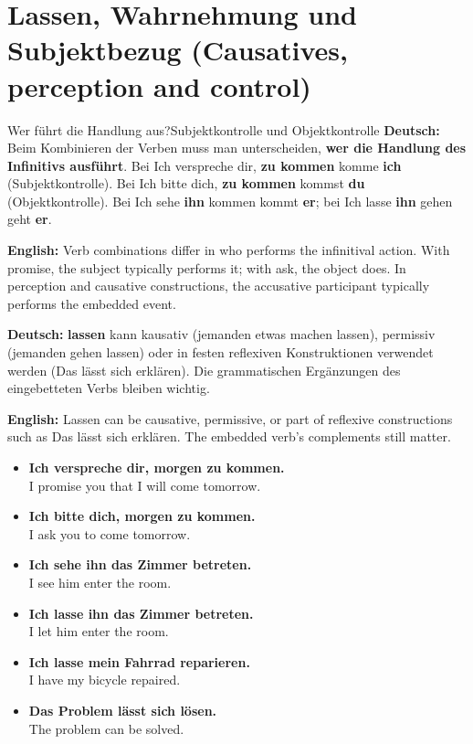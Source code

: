 \documentclass[a4paper,11pt]{article}
\newcommand{\GermanText}[1]{\textbf{Deutsch: }#1\par}
\newcommand{\EnglishText}[1]{{\small\color{SoftGray}\textbf{English: }#1\par}}
\newcommand{\ExampleItem}[2]{\item \textbf{#1}\\{\small\color{SoftGray}#2}}
\newcommand{\DEEN}[2]{\GermanText{#1}\EnglishText{#2}}
\newcommand{\Pair}[2]{\ExampleItem{#1}{#2}}
\begin{document}
\section{Lassen, Wahrnehmung und Subjektbezug \textnormal{(Causatives, perception and control)}}
\begin{grammarentry}{Wer führt die Handlung aus?}{Subjektkontrolle und Objektkontrolle}
\DEEN{Beim Kombinieren der Verben muss man unterscheiden, \textbf{wer die Handlung des Infinitivs ausführt}. Bei \glqq Ich verspreche dir, \textbf{zu kommen}\grqq{} komme \textbf{ich} (Subjektkontrolle). Bei \glqq Ich bitte dich, \textbf{zu kommen}\grqq{} kommst \textbf{du} (Objektkontrolle). Bei \glqq Ich sehe \textbf{ihn} kommen\grqq{} kommt \textbf{er}; bei \glqq Ich lasse \textbf{ihn} gehen\grqq{} geht \textbf{er}.}{Verb combinations differ in who performs the infinitival action. With promise, the subject typically performs it; with ask, the object does. In perception and causative constructions, the accusative participant typically performs the embedded event.}
\DEEN{\textbf{lassen} kann kausativ (\glqq jemanden etwas machen lassen\grqq), permissiv (\glqq jemanden gehen lassen\grqq) oder in festen reflexiven Konstruktionen verwendet werden (\glqq Das lässt sich erklären\grqq). Die grammatischen Ergänzungen des eingebetteten Verbs bleiben wichtig.}{Lassen can be causative, permissive, or part of reflexive constructions such as Das lässt sich erklären. The embedded verb's complements still matter.}
\end{grammarentry}
\begin{exbox}\begin{itemize}
\Pair{Ich verspreche dir, morgen zu kommen.}{I promise you that I will come tomorrow.}
\Pair{Ich bitte dich, morgen zu kommen.}{I ask you to come tomorrow.}
\Pair{Ich sehe ihn das Zimmer betreten.}{I see him enter the room.}
\Pair{Ich lasse ihn das Zimmer betreten.}{I let him enter the room.}
\Pair{Ich lasse mein Fahrrad reparieren.}{I have my bicycle repaired.}
\Pair{Das Problem lässt sich lösen.}{The problem can be solved.}
\end{itemize}\end{exbox}
\end{document}
